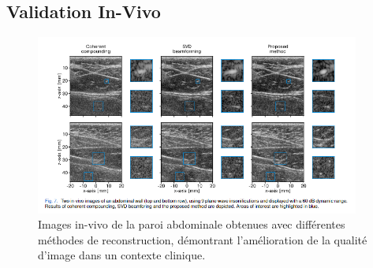 \documentclass[12pt,a4paper]{article}
\begin{document}
\subsection{Validation In-Vivo}
\begin{figure}[H]
    \centering
    \includegraphics[width=0.95\textwidth]{paper/fig_7.png}
    \caption{Images in-vivo de la paroi abdominale obtenues avec différentes méthodes de reconstruction, démontrant l'amélioration de la qualité d'image dans un contexte clinique.}
\end{figure}
\end{document}
